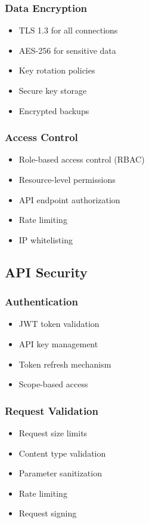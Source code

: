 \subsubsection{Data Encryption}
\begin{itemize}
    \item TLS 1.3 for all connections
    \item AES-256 for sensitive data
    \item Key rotation policies
    \item Secure key storage
    \item Encrypted backups
\end{itemize}

\subsubsection{Access Control}
\begin{itemize}
    \item Role-based access control (RBAC)
    \item Resource-level permissions
    \item API endpoint authorization
    \item Rate limiting
    \item IP whitelisting
\end{itemize}

\subsection{API Security}

\subsubsection{Authentication}
\begin{itemize}
    \item JWT token validation
    \item API key management
    \item Token refresh mechanism
    \item Scope-based access
\end{itemize}

\subsubsection{Request Validation}
\begin{itemize}
    \item Request size limits
    \item Content type validation
    \item Parameter sanitization
    \item Rate limiting
    \item Request signing
\end{itemize}

